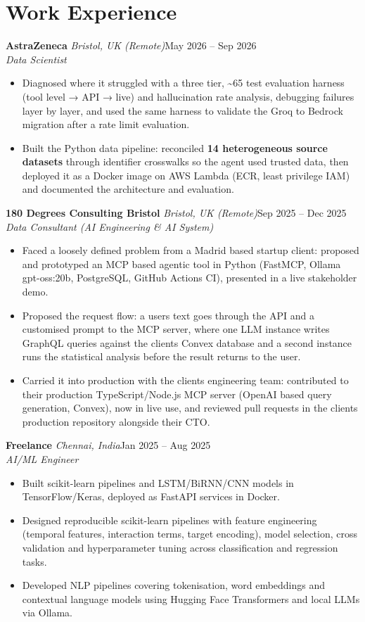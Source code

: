\documentclass[a4paper,11pt]{article}
\newcommand{\role}[4]{%
  \textbf{#1}{\color{muted}\,\textperiodcentered\,\textit{#2}}\hfill{\color{muted}#3}\\
  \textit{#4}\par}
\newcommand{\gap}{\vspace{5pt}}
\newcommand{\num}[1]{\textbf{#1}}   %
\begin{document}
\section{Work Experience}
\role{AstraZeneca}{Bristol, UK (Remote)}{May 2026 – Sep 2026}{Data Scientist}
\begin{itemize}
  \item Diagnosed where it struggled with a three tier, \textasciitilde{}65 test evaluation harness (tool level → API → live) and hallucination rate analysis, debugging failures layer by layer, and used the same harness to validate the Groq to Bedrock migration after a rate limit evaluation.
  \item Built the Python data pipeline: reconciled \num{14 heterogeneous source datasets} through identifier crosswalks so the agent used trusted data, then deployed it as a Docker image on AWS Lambda (ECR, least privilege IAM) and documented the architecture and evaluation.
\end{itemize}
\gap
{}
\role{180 Degrees Consulting Bristol}{Bristol, UK (Remote)}{Sep 2025 – Dec 2025}{Data Consultant (AI Engineering \& AI System)}
\begin{itemize}
  \item Faced a loosely defined problem from a Madrid based startup client: proposed and prototyped an MCP based agentic tool in Python (FastMCP, Ollama gpt-oss:20b, PostgreSQL, GitHub Actions CI), presented in a live stakeholder demo.
  \item Proposed the request flow: a user\textquotesingle{}s text goes through the API and a customised prompt to the MCP server, where one LLM instance writes GraphQL queries against the client\textquotesingle{}s Convex database and a second instance runs the statistical analysis before the result returns to the user.
  \item Carried it into production with the client\textquotesingle{}s engineering team: contributed to their production TypeScript/Node.js MCP server (OpenAI based query generation, Convex), now in live use, and reviewed pull requests in the client\textquotesingle{}s production repository alongside their CTO.
\end{itemize}
\gap
{}
\role{Freelance}{Chennai, India}{Jan 2025 – Aug 2025}{AI/ML Engineer}
\begin{itemize}
  \item Built scikit-learn pipelines and LSTM/BiRNN/CNN models in TensorFlow/Keras, deployed as FastAPI services in Docker.
  \item Designed reproducible scikit-learn pipelines with feature engineering (temporal features, interaction terms, target encoding), model selection, cross validation and hyperparameter tuning across classification and regression tasks.
  \item Developed NLP pipelines covering tokenisation, word embeddings and contextual language models using Hugging Face Transformers and local LLMs via Ollama.
\end{itemize}
\end{document}
